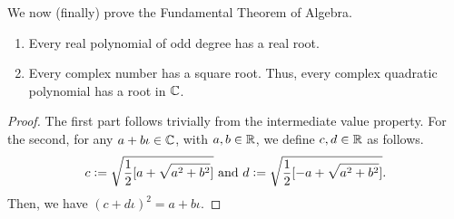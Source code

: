 We now (finally) prove the Fundamental Theorem of Algebra. 

\begin{lem} \label{lem:FTA-lem}
    \phantom{hi}
    \begin{enumerate}
        \item Every real polynomial of odd degree has a real root. 
        \item Every complex number has a square root. Thus, every complex quadratic polynomial has a root in $\mathbb{C}$.
    \end{enumerate}
\end{lem}
\begin{proof}
    The first part follows trivially from the intermediate value property. For the second, for any $a + b\iota \in \mathbb{C}$, with $a,b \in \mathbb{R}$, we define $c,d \in \mathbb{R}$ as follows.
    \[
        c \vcentcolon= \sqrt{\frac{1}{2} [ a + \sqrt{a^2 + b^2} ]} \text{ and } d \vcentcolon= \sqrt{\frac{1}{2} [ -a + \sqrt{a^2 + b^2} ]}.
    \]  
    Then, we have $(c+d\iota)^2 = a + b\iota$.
\end{proof}

